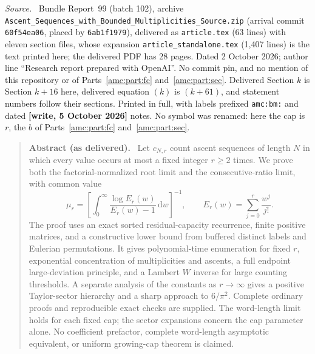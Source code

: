 \documentclass[11pt,letterpaper]{article}
\theoremstyle{remark}\newtheorem{remark}[theorem]{Remark}
\newcommand{\dd}{\,\mathrm d}
\newenvironment{partsource}{\par\medskip\noindent\begin{minipage}{\linewidth}\small\raggedright\textit{Source.}\ }{\end{minipage}\par\medskip}
\newenvironment{partabstract}{\par\begin{quote}\small\textbf{Abstract (as delivered).}\ }{\end{quote}\par}
\newcommand{\repopath}[1]{\nolinkurl{#1}}
\begin{document}
\begin{partsource}
Bundle Report~99 (batch 102), archive \repopath{Ascent_Sequences_with_Bounded_Multiplicities_Source.zip} (arrival commit \texttt{60f54ea06}, placed by \texttt{6ab1f1979}), delivered as \texttt{article.tex} (63 lines) with eleven section files, whose expansion \texttt{article\_standalone.tex} (1,407 lines) is the text printed here; the delivered PDF has 28 pages. Dated 2 October 2026; author line ``Research report prepared with OpenAI''. No commit pin, and no mention of this repository or of Parts~\ref{amc:part:fc} and~\ref{amc:part:sec}. Delivered Section $k$ is Section $k+16$ here, delivered equation $(k)$ is $(k+61)$, and statement numbers follow their sections. Printed in full, with labels prefixed \texttt{amc:bm:} and dated \textbf{[write, 5 October 2026]} notes. No symbol was renamed: here the cap is $r$, the $b$ of Parts~\ref{amc:part:fc} and~\ref{amc:part:sec}.
\end{partsource}

\begin{partabstract}
Let $c_{N,r}$ count ascent sequences of length $N$ in which every value occurs at most a fixed integer $r\ge2$ times. We prove both the factorial-normalized root limit and the consecutive-ratio limit, with common value
\[
 \mu_r=\left[\int_0^\infty
 \frac{\log E_r(w)}{E_r(w)-1}\dd w\right]^{-1},
 \qquad E_r(w)=\sum_{j=0}^r\frac{w^j}{j!}.
\]
The proof uses an exact sorted residual-capacity recurrence, finite positive matrices, and a constructive lower bound from buffered distinct labels and Eulerian permutations. It gives polynomial-time enumeration for fixed $r$, exponential concentration of multiplicities and ascents, a full endpoint large-deviation principle, and a Lambert $W$ inverse for large counting thresholds. A separate analysis of the constants as $r\to\infty$ gives a positive Taylor-sector hierarchy and a sharp approach to $6/\pi^2$. Complete ordinary proofs and reproducible exact checks are supplied. The word-length limit holds for each fixed cap; the sector expansions concern the cap parameter alone. No coefficient prefactor, complete word-length asymptotic equivalent, or uniform growing-cap theorem is claimed.
\end{partabstract}
\end{document}
